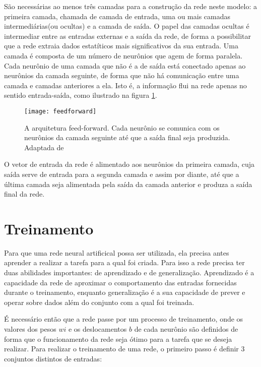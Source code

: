 São necessárias ao menos três camadas para a construção da rede neste modelo: a primeira camada, chamada de camada de entrada, uma ou mais camadas intermediárias(ou ocultas) e a camada de saída. O papel das camadas ocultas é intermediar entre as entradas externas e a saída da rede, de forma a possibilitar que a rede extraia dados estatíticos mais significativos da sua entrada.  Uma camada é composta de um número de neurônios que agem de forma paralela. Cada neurônio de uma camada que não é a de saída está conectado apenas ao neurônios da camada seguinte, de forma que não há comunicação entre uma camada e camadas anteriores a ela. Isto é, a informação flui na rede apenas no sentido entrada-saída, como ilustrado na figura \ref{fig:feedfoward}.

\begin{figure}
\centering
\texttt{[image: feedforward]}
\label{fig:feedfoward}
\caption{A arquitetura feed-forward. Cada neurônio se comunica com os neurônios da camada seguinte até que a saída final seja produzida. Adaptada de \cite{Haykin}}
\end{figure}

O vetor de entrada da rede é alimentado aos neurônios da primeira camada, cuja saída serve de entrada para a segunda camada e assim por diante, até que a última camada seja alimentada pela saída da camada anterior e produza a saída final da rede. 

\section{Treinamento}

Para que uma rede neural artificical possa ser utilizada, ela precisa antes aprender a realizar a tarefa para a qual foi criada. Para isso a rede precisa ter duas abilidades importantes: de aprendizado e de generalização. Aprendizado é a capacidade da rede de aproximar o comportamento das entradas fornecidas durante o treinamento, enquanto generalização é a sua capacidade de prever e operar sobre dados além do conjunto com a qual foi treinada\cite{ZhangNNSurvey}.

É necessário então que a rede passe por um processo de treinamento, onde os valores dos pesos $wi$ e os deslocamentos $b$ de cada neurônio são definidos de forma que o funcionamento da rede seja ótimo para a tarefa que se deseja realizar. Para realizar o treinamento de uma rede, o primeiro passo é definir 3 conjuntos distintos de entradas:

